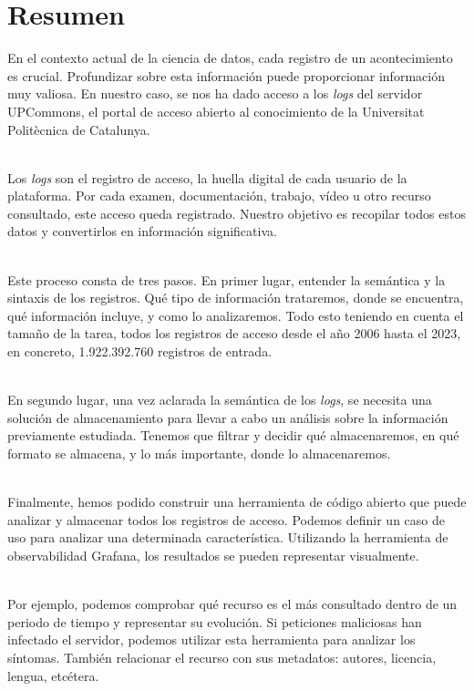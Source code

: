 \chapter*{Resumen}\label{ch:abstract-es}

En el contexto actual de la ciencia de datos, cada registro de un acontecimiento es crucial.
Profundizar sobre esta información puede proporcionar información muy valiosa.
En nuestro caso, se nos ha dado acceso a los \textit{logs} del servidor UPCommons, el portal de acceso abierto al conocimiento de la Universitat Politècnica de Catalunya.

\noindent \\
Los \textit{logs} son el registro de acceso, la huella digital de cada usuario de la plataforma.
Por cada examen, documentación, trabajo, vídeo u otro recurso consultado, este acceso queda registrado.
Nuestro objetivo es recopilar todos estos datos y convertirlos en información significativa.

\noindent \\
Este proceso consta de tres pasos.
En primer lugar, entender la semántica y la sintaxis de los registros.
Qué tipo de información trataremos, donde se encuentra, qué información incluye, y como lo analizaremos.
Todo esto teniendo en cuenta el tamaño de la tarea, todos los registros de acceso desde el año 2006 hasta el 2023, en concreto, 1.922.392.760 registros de entrada.

\noindent \\
En segundo lugar, una vez aclarada la semántica de los \textit{logs}, se necesita una solución de almacenamiento para llevar a cabo un análisis sobre la información previamente estudiada.
Tenemos que filtrar y decidir qué almacenaremos, en qué formato se almacena, y lo más importante, donde lo almacenaremos.

\noindent \\
Finalmente, hemos podido construir una herramienta de código abierto que puede analizar y almacenar todos los registros de acceso.
Podemos definir un caso de uso para analizar una determinada característica.
Utilizando la herramienta de observabilidad Grafana, los resultados se pueden representar visualmente.

\noindent \\
Por ejemplo, podemos comprobar qué recurso es el más consultado dentro de un periodo de tiempo y representar su evolución.
Si peticiones maliciosas han infectado el servidor, podemos utilizar esta herramienta para analizar los síntomas.
También relacionar el recurso con sus metadatos: autores, licencia, lengua, etcétera.

